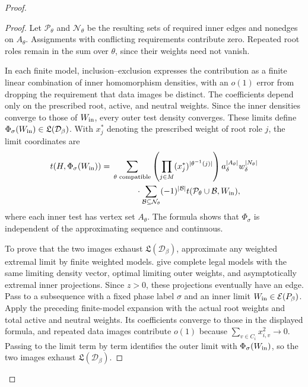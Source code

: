 \documentclass[10pt]{article}
\numberwithin{equation}{section}
\theoremstyle{definition}
\newcommand{\cD}{\mathcal D}\newcommand{\cE}{\mathcal E}\newcommand{\cF}{\mathcal F}
\begin{document}
\begin{proof}
\begin{proof}
Let $\mathcal P_\theta$ and $\mathcal N_\theta$ be the resulting sets of required inner edges and nonedges on $A_\theta$. Assignments with conflicting requirements contribute zero. Repeated root roles remain in the sum over $\theta$, since their weights need not vanish.

In each finite model, inclusion--exclusion expresses the contribution as a finite linear combination of inner homomorphism densities, with an $o(1)$ error from dropping the requirement that data images be distinct. The coefficients depend only on the prescribed root, active, and neutral weights. Since the inner densities converge to those of $W_{\rm in}$, every outer test density converges. These limits define $\Phi_\sigma(W_{\rm in})\in\mathfrak L(\cD_\beta)$. With $x_j^*$ denoting the prescribed weight of root role $j$, the limit coordinates are
\[
\begin{split}
 t(H,\Phi_\sigma(W_{\rm in}))
 ={}&\sum_{\theta\text{ compatible}}
       \left(\prod_{j\in M}(x_j^*)^{|\theta^{-1}(j)|}\right)
       a_\delta^{|A_\theta|}w_\delta^{|N_\theta|}\\
 &\hspace{10mm}\cdot\sum_{\mathcal B\subseteq\mathcal N_\theta}
           (-1)^{|\mathcal B|}
           t(\mathcal P_\theta\cup\mathcal B,W_{\rm in}),
\end{split}
\]
where each inner test has vertex set $A_\theta$. The formula shows that $\Phi_\sigma$ is independent of the approximating sequence and continuous.

To prove that the two images exhaust $\mathfrak L(\cD_\beta)$, approximate any weighted extremal limit by finite weighted models.  give complete legal models with the same limiting density vector, optimal limiting outer weights, and asymptotically extremal inner projections. Since $z>0$, these projections eventually have an edge. Pass to a subsequence with a fixed phase label $\sigma$ and an inner limit $W_{\rm in}\in\cE(P_\beta)$. Apply the preceding finite-model expansion with the actual root weights and total active and neutral weights. Its coefficients converge to those in the displayed formula, and repeated data images contribute $o(1)$ because $\sum_{v\in C_i}x_{i,v}^2\to0$. Passing to the limit term by term identifies the outer limit with $\Phi_\sigma(W_{\rm in})$, so the two images exhaust $\mathfrak L(\cD_\beta)$.


\end{proof}
\end{proof}
\end{document}
